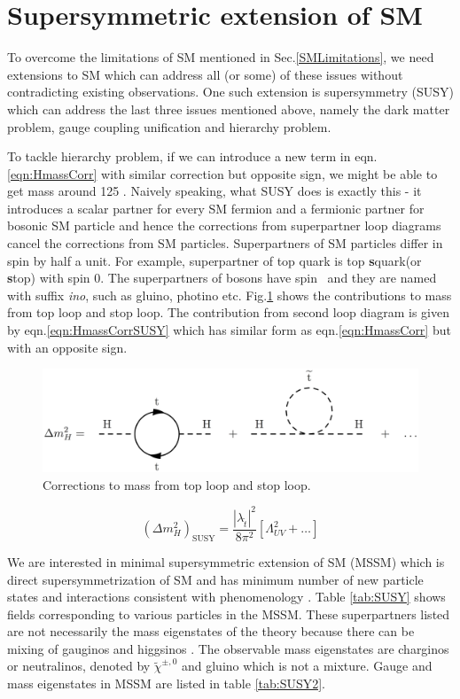 \section{Supersymmetric extension of SM}
To overcome the limitations of SM mentioned in Sec.\ref{SMLimitations}, we need extensions to SM which can address all (or some) of these issues without contradicting existing observations. One such extension is supersymmetry (SUSY) which can address the last three issues mentioned above, namely the dark matter problem, gauge coupling unification and hierarchy problem.

To tackle hierarchy problem, if we can introduce a new term in eqn.\ref{eqn:HmassCorr} with similar correction but opposite sign, we might be able to get \higgs mass around 125 \gev. Naively speaking, what SUSY does is exactly this - it introduces a scalar partner for every SM fermion and a fermionic partner for bosonic SM particle and hence the corrections from superpartner loop diagrams cancel the corrections from SM particles. Superpartners of SM particles differ in spin by half a unit. For example, superpartner of top quark is top \textbf{s}quark(or \textbf{s}top) with spin 0. The superpartners of bosons have spin \textonehalf\ and they are named with suffix \textit{ino}, such as gluino, photino etc. Fig.\ref{fig:hierarchy_problem_higgs_mass_stop} shows the contributions to \higgs mass from top loop and stop loop. The contribution from second loop diagram is given by eqn.\ref{eqn:HmassCorrSUSY} which has similar form as eqn.\ref{eqn:HmassCorr} but with an opposite sign.
\begin{figure}[h!]
\centering
\includegraphics[width=0.8\linewidth]{../Figures/Chap1/hierarchy_problem_higgs_mass_stop}
\caption{Corrections to \higgs mass from top loop and stop loop.}
\label{fig:hierarchy_problem_higgs_mass_stop}
\end{figure}
\begin{equation}
(\Delta m_{H}^2)_{\text{SUSY}} = \frac{|\lambda_{\tilde{t}}|^2}{8\pi^2}[\Lambda_{UV}^2 + \dots]
\label{eqn:HmassCorrSUSY}
\end{equation}

We are interested in minimal supersymmetric extension of SM (MSSM) which is direct supersymmetrization of SM and has minimum number of new particle states and interactions consistent with phenomenology \cite{baer_tata_2006}. Table \ref{tab:SUSY} shows fields corresponding to various particles in the MSSM. These superpartners listed are not necessarily the mass eigenstates of the theory because there can be mixing of gauginos and higgsinos \cite{Martin:1997ns}. The observable mass eigenstates are charginos or neutralinos, denoted by $\tilde{\chi}^{\pm,0}$ and gluino which is not a mixture. Gauge and mass eigenstates in MSSM are listed in table \ref{tab:SUSY2}.

